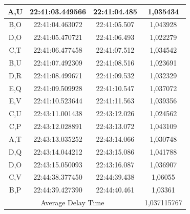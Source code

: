 \begin{table}[htpb]
\begin{tabular}{|ccc|c|}
  \multicolumn{1}{|c|}{A,U}  & \multicolumn{1}{c|}{22:41:03.449566} & 22:41:04.485       & 1,035434    \\ \hline
  \multicolumn{1}{|c|}{B,O}  & \multicolumn{1}{c|}{22:41:04.463072} & 22:41:05.507       & 1,043928    \\ \hline
  \multicolumn{1}{|c|}{D,O}  & \multicolumn{1}{c|}{22:41:05.470721} & 22:41:06.493       & 1,022279    \\ \hline
  \multicolumn{1}{|c|}{C,T}  & \multicolumn{1}{c|}{22:41:06.477458} & 22:41:07.512       & 1,034542    \\ \hline
  \multicolumn{1}{|c|}{B,U}  & \multicolumn{1}{c|}{22:41:07.492309} & 22:41:08.516       & 1,023691    \\ \hline
  \multicolumn{1}{|c|}{D,R}  & \multicolumn{1}{c|}{22:41:08.499671} & 22:41:09.532       & 1,032329    \\ \hline
  \multicolumn{1}{|c|}{E,Q}  & \multicolumn{1}{c|}{22:41:09.509928} & 22:41:10.547       & 1,037072    \\ \hline
  \multicolumn{1}{|c|}{E,V}  & \multicolumn{1}{c|}{22:41:10.523644} & 22:41:11.563       & 1,039356    \\ \hline
  \multicolumn{1}{|c|}{C,U}  & \multicolumn{1}{c|}{22:43:11.001438} & 22:43:12.026       & 1,024562    \\ \hline
  \multicolumn{1}{|c|}{C,P}  & \multicolumn{1}{c|}{22:43:12.028891} & 22:43:13.072       & 1,043109    \\ \hline
  \multicolumn{1}{|c|}{A,T}  & \multicolumn{1}{c|}{22:43:13.035252} & 22:43:14.066       & 1,030748    \\ \hline
  \multicolumn{1}{|c|}{D,Q}  & \multicolumn{1}{c|}{22:43:14.044212} & 22:43:15.086       & 1,041788    \\ \hline
  \multicolumn{1}{|c|}{D,O}  & \multicolumn{1}{c|}{22:43:15.050093} & 22:43:16.087       & 1,036907    \\ \hline
  \multicolumn{1}{|c|}{C,V}  & \multicolumn{1}{c|}{22:44:38.377450} & 22:44:39.438       & 1,06055     \\ \hline
  \multicolumn{1}{|c|}{B,P}  & \multicolumn{1}{c|}{22:44:39.427390} & 22:44:40.461       & 1,03361     \\ \hline
  \multicolumn{3}{|c|}{Average Delay Time}                                               & 1,037115767 \\ \hline
  \end{tabular}
  \end{table}

